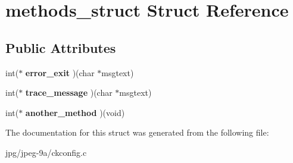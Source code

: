 \hypertarget{structmethods__struct}{\section{methods\+\_\+struct Struct Reference}
\label{structmethods__struct}
}
\subsection*{Public Attributes}
\begin{DoxyCompactItemize}
\item 
\hypertarget{structmethods__struct_a239f581263282ea0439cf365a2800858}{int($\ast$ {\bfseries error\+\_\+exit} )(char $\ast$msgtext)}\label{structmethods__struct_a239f581263282ea0439cf365a2800858}

\item 
\hypertarget{structmethods__struct_a6c5ce878a3fb550eef80243aadd50188}{int($\ast$ {\bfseries trace\+\_\+message} )(char $\ast$msgtext)}\label{structmethods__struct_a6c5ce878a3fb550eef80243aadd50188}

\item 
\hypertarget{structmethods__struct_a186f2ea75e8385d2bc921f7fc80f7ea1}{int($\ast$ {\bfseries another\+\_\+method} )(void)}\label{structmethods__struct_a186f2ea75e8385d2bc921f7fc80f7ea1}

\end{DoxyCompactItemize}


The documentation for this struct was generated from the following file\+:\begin{DoxyCompactItemize}
\item 
jpg/jpeg-\/9a/ckconfig.\+c\end{DoxyCompactItemize}
